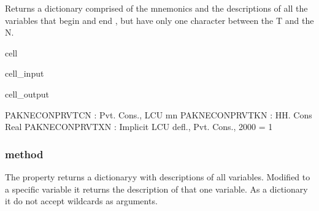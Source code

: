 \documentclass[letterpaper,10pt,english]{jupyterBook}
\begin{document}
\sphinxAtStartPar
Returns a dictionary comprised of the mnemonics and the descriptions of all the variables that begin  and end , but have only one character between the T and the N.

\begin{sphinxuseclass}{cell}\begin{sphinxVerbatimInput}

\begin{sphinxuseclass}{cell_input}
\begin{sphinxVerbatim}[commandchars=\\\{\}]
\PYG{p}{[}\PYG{p}{]}
\end{sphinxVerbatim}

\end{sphinxuseclass}\end{sphinxVerbatimInput}
\begin{sphinxVerbatimOutput}

\begin{sphinxuseclass}{cell_output}
\begin{sphinxVerbatim}[commandchars=\\\{\}]
PAKNECONPRVTCN : Pvt. Cons., LCU mn
PAKNECONPRVTKN : HH. Cons Real
PAKNECONPRVTXN : Implicit LCU defl., Pvt. Cons., 2000 = 1
\end{sphinxVerbatim}

\end{sphinxuseclass}\end{sphinxVerbatimOutput}

\end{sphinxuseclass}

\subsubsection{ method}
\label{\detokenize{content/05_WBModels/LoadingWBModel:var-description-method}}
\sphinxAtStartPar
The property returns a dictionaryy with descriptions of all variables.  Modified to a specific variable it returns the description of that one variable.  As a dictionary it do not accept wildcards as arguments.
\end{document}
